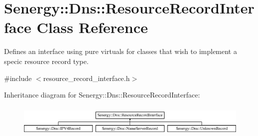\hypertarget{class_senergy_1_1_dns_1_1_resource_record_interface}{\section{Senergy\-:\-:Dns\-:\-:Resource\-Record\-Interface Class Reference}
\label{class_senergy_1_1_dns_1_1_resource_record_interface}
}


Defines an interface using pure virtuals for classes that wish to implement a specic resource record type.  




{\ttfamily \#include $<$resource\-\_\-record\-\_\-interface.\-h$>$}

Inheritance diagram for Senergy\-:\-:Dns\-:\-:Resource\-Record\-Interface\-:\begin{figure}[H]
\begin{center}
\leavevmode
\includegraphics[height=1.511471cm]{class_senergy_1_1_dns_1_1_resource_record_interface}
\end{center}
\end{figure}
